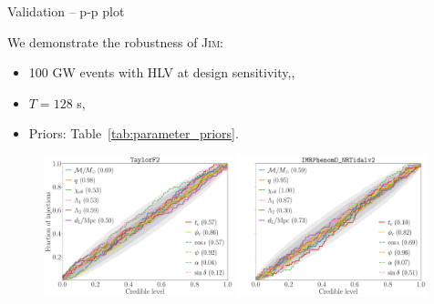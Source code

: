 \documentclass[usenames,dvipsnames,t]{beamer}
\begin{document}
\begin{frame}{Validation -- p-p plot}
  
  \def\x{1mm}

  We demonstrate the robustness of \textsc{Jim}:

  \begin{itemize}
    \item 100 GW events with HLV at design sensitivity,,
    
    \vspace{\x}
    
    \item $T = 128$ s,
    
    \vspace{\x}
    
    \item Priors: Table~\ref{tab:parameter_priors}.
  \end{itemize}

  
  \begin{figure}
    \includegraphics[width=0.49\textwidth]{Figures/pp_plot_TF2.pdf}
    \includegraphics[width=0.49\textwidth]{Figures/pp_plot_NRTv2.pdf}
  \end{figure}
  
\end{frame}
\end{document}
